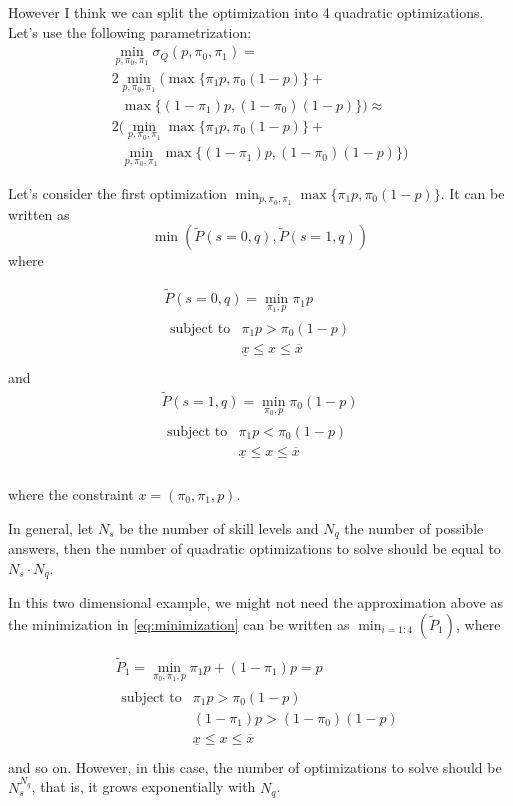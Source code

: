 \documentclass[runningheads]{llncs}
\begin{document}
	However I think we can split the optimization into 4 quadratic optimizations.
	Let's use the following parametrization:
	\begin{multline}\label{eq:minimization}
		\min_{p,\pi_0,\pi_1} \sigma_Q(p,\pi_0,\pi_1) = \\
		2\min_{p,\pi_0,\pi_1} \bigl( \max\{\pi_1 p, \pi_0 (1-p)\} + \\
		~~~ \max\{(1-\pi_1 )p, (1-\pi_0) (1-p)\} \bigr) \approx \\
		2 \bigl( \min_{p,\pi_0,\pi_1}  \max\{\pi_1 p, \pi_0 (1-p)\} + \\
		~~~ \min_{p,\pi_0,\pi_1} \max\{(1-\pi_1 )p, (1-\pi_0) (1-p)\} \bigr) 
	\end{multline}
	
	Let's consider the first optimization $\min_{p,\pi_0,\pi_1}  \max\{\pi_1 p, \pi_0 (1-p)\}$. It 
	can be written as
	$$ \min(\tilde{P}(s=0,q),\tilde{P}(s=1,q)) $$ 
	where 

	\begin{multline}
		\tilde{P}(s=0,q) = \min_{\pi_1 ,p} \pi_1 p \\
		\begin{array}{ll}
			\text{subject to} & \pi_1 p > \pi_0 (1-p) \\
			~&\underline{x} \leq x\leq \overline{x}\\ 
		\end{array}
	\end{multline}
	and 
	\begin{multline}
		\tilde{P}(s=1,q) = \min_{\pi_0 ,p} \pi_0 (1-p) \\
		\begin{array}{ll}
			\text{subject to} & \pi_1 p < \pi_0 (1-p)\\
			~&\underline{x} \leq x\leq \overline{x}\\ 
		\end{array}
	\end{multline}
	
	where the constraint $x = (\pi_0, \pi_1 ,p)$.
	
	
	In general, let $N_s$ be the number of skill levels and $N_q$ the number of possible 
	answers, then the number of quadratic optimizations to solve should be equal to 
	$N_s\cdot N_q$. 
	
	In this two dimensional example, we might not need the approximation above as the 
	minimization in \ref{eq:minimization} can be written as $\min_{i=1:4}(\tilde{P}_1)$, where
	
	\begin{multline}
		\tilde{P}_1 = \min_{\pi_0,\pi_1,p} \pi_1 p+ (1-\pi_1)p = p \\
		\begin{array}{ll}
			\text{subject to} & \pi_1 p > \pi_0 (1-p) \\
			~&  (1-\pi_1)p > (1-\pi_0)(1-p)  \\
			~&\underline{x} \leq x\leq \overline{x}\\ 
		\end{array}
	\end{multline}
	and so on. However, in this case, the number of optimizations to solve should be 
	$N_s^{N_q}$, that is, it grows exponentially with  $N_q$. 
	
\end{document}
